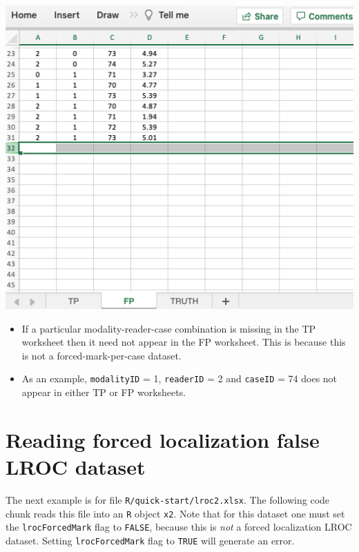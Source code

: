 \documentclass[
]{book}
\providecommand{\tightlist}{%
  \setlength{\itemsep}{0pt}\setlength{\parskip}{0pt}}
\begin{document}
\includegraphics[width=1\textwidth,height=\textheight]{images/quick-start/lroc2FP2.png}

\begin{itemize}
\tightlist
\item
  If a particular modality-reader-case combination is missing in the TP worksheet then it need not appear in the FP worksheet. This is because this is not a forced-mark-per-case dataset.
\item
  As an example, \texttt{modalityID} = 1, \texttt{readerID} = 2 and \texttt{caseID} = 74 does not appear in either TP or FP worksheets.
\end{itemize}

\hypertarget{quick-start-lroc-data-2}{%
\section{Reading forced localization false LROC dataset}\label{quick-start-lroc-data-2}}

The next example is for file \texttt{R/quick-start/lroc2.xlsx}. The following code chunk reads this file into an \texttt{R} object \texttt{x2}. Note that for this dataset one must set the \texttt{lrocForcedMark} flag to \texttt{FALSE}, because this is \emph{not} a forced localization LROC dataset. Setting \texttt{lrocForcedMark} flag to \texttt{TRUE} will generate an error.
\end{document}
